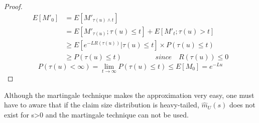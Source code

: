 \documentclass[project2.tex]{subfiles}
\begin{document}
\begin{proof}
\begin{align*}
E[M'_0] &= E[M'_{\tau (u)\wedge t}] \\
&=E[M'_{\tau (u)};{\tau (u)}\leq t]+E[M'_t;\tau (u)>t]\\
&\geq E[e^{-LR(\tau (u))}|\tau (u)\leq t]  \times P(\tau (u)\leq t)\\
&\geq P(\tau (u)\leq t)  \hspace{2cm}since\quad R(\tau (u))\leq 0
\end{align*}
$$P(\tau (u)<\infty)=\lim_{t \to \infty} P(\tau (u)\leq t)\leq E[M_0]=e^{-Lu}$$
\end{proof}
Although the martingale technique makes the approximation very easy, one must have to aware that if the claim size distribution is heavy-tailed, $\hat{m}_U(s)$ does not exist for s>0 and the martingale technique can not be used.
\end{document}

